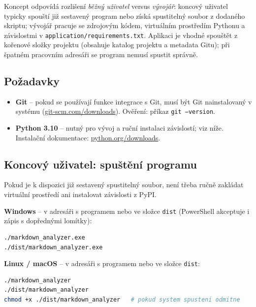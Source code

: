 \documentclass[12pt, a4paper]{article}
\begin{document}
Koncept odpovídá rozlišení \emph{běžný uživatel} versus \emph{vývojář}: koncový uživatel typicky spouští již sestavený program nebo získá spustitelný soubor z dodaného skriptu; vývojář pracuje se zdrojovým kódem, virtuálním prostředím Pythonu a závislostmi v \texttt{application/requirements.txt}. Aplikaci je vhodné spouštět z kořenové složky projektu (obsahuje katalog projektu a metadata Gitu); při špatném pracovním adresáři se program nemusí spustit správně.

\subsection{Požadavky}

\begin{itemize}
    \item \textbf{Git} -- pokud se používají funkce integrace s Git, musí být Git nainstalovaný v systému (\href{https://git-scm.com/downloads}{git-scm.com/downloads}). Ověření: příkaz \texttt{git --version}.
    \item \textbf{Python 3.10} -- nutný pro vývoj a ruční instalaci závislostí; viz níže. Instalační dokumentace: \href{https://www.python.org/downloads/}{python.org/downloads}.
\end{itemize}

\subsection{Koncový uživatel: spuštění programu}

Pokud je k dispozici již sestavený spustitelný soubor, není třeba ručně zakládat virtuální prostředí ani instalovat závislosti z PyPI.

\textbf{Windows} -- v adresáři s programem nebo ve složce \texttt{dist} (PowerShell akceptuje i zápis s dopřednými lomítky):

\begin{lstlisting}[basicstyle=\ttfamily\small]
./markdown_analyzer.exe
./dist/markdown_analyzer.exe
\end{lstlisting}

\textbf{Linux / macOS} -- v adresáři s programem nebo ve složce \texttt{dist}:

\begin{lstlisting}[language=bash, basicstyle=\ttfamily\small]
./markdown_analyzer
./dist/markdown_analyzer
chmod +x ./dist/markdown_analyzer   # pokud system spusteni odmitne
\end{lstlisting}
\end{document}
